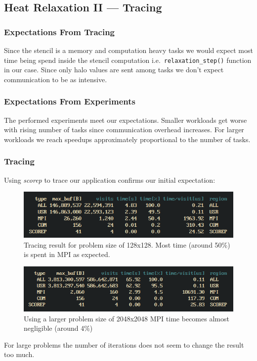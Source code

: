 \documentclass[]{scrartcl}
\begin{document}
\subsection{Heat Relaxation II --- Tracing}
\subsubsection{Expectations From Tracing}
Since the stencil is a memory and computation heavy tasks we would expect most time being spend
inside the stencil computation i.e.\ \texttt{relaxation\_step()} function in our case.
Since only halo values are sent among tasks we don't expect communication to be as intensive.

\subsubsection{Expectations From Experiments}
The performed experiments meet our expectations.
Smaller workloads get worse with rising number of tasks since communication overhead increases.
For larger workloads we reach speedups approximately proportional to the number of tasks.

\subsubsection{Tracing}
Using \emph{scorep} to trace our application confirms our initial expectation:
\begin{figure}[htpb]
	\centering
	\includegraphics[width=1\linewidth]{./img/scorep_128_100.png}
	\caption{Tracing result for problem size of 128x128. Most time (around 50\%) is spent in MPI as expected. }%
	\label{fig:./img/scorep_128_100}
\end{figure}

\begin{figure}[htpb]
	\centering
	\includegraphics[width=1\linewidth]{./img/scorep_2048_10.png}
	\caption{Using a larger problem size of 2048x2048 MPI time becomes almost negligible (around 4\%)}%
	\label{fig:./img/scorep_2048_10}
\end{figure}
For large problems the number of iterations does not seem to change the result too much.
\end{document}
